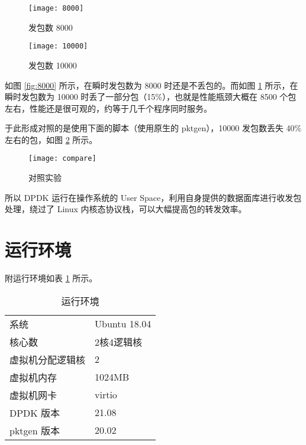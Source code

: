     \begin{figure}[H]
        \centering
        \begin{minipage}{0.48\textwidth}
            \centering
            \texttt{[image: 8000]}
            \caption{发包数 8000}\label{fig:8000}
        \end{minipage}
        \begin{minipage}{0.48\textwidth}
            \centering
            \texttt{[image: 10000]}
            \caption{发包数 10000}\label{fig:10000}
        \end{minipage}
    \end{figure}

    如图 \ref{fig:8000} 所示，在瞬时发包数为 8000 时还是不丢包的。而如图 \ref{fig:10000} 所示，在瞬时发包数为 10000 时丢了一部分包（15\%），也就是性能瓶颈大概在 8500 个包左右，性能还是很可观的，约等于几千个程序同时服务。

    于此形成对照的是使用下面的脚本（使用原生的 pktgen\cite{pktgen}），10000 发包数丢失 40\% 左右的包，如图 \ref{fig:compare} 所示。

    
    \begin{figure}[H]
        \centering
        \texttt{[image: compare]}
        \caption{对照实验}\label{fig:compare}
    \end{figure}

    所以 DPDK 运行在操作系统的 User Space，利用自身提供的数据面库进行收发包处理，绕过了 Linux 内核态协议栈\cite{dpdkinfo}，可以大幅提高包的转发效率。

    \section*{运行环境}

    附运行环境如表 \ref{tab:env} 所示。

    \begin{table}[H]
    \centering
    \caption{运行环境}\label{tab:env}
    \begin{tabular}{ll}
        \toprule
        系统 & Ubuntu 18.04 \\
        核心数 & 2核4逻辑核 \\
        虚拟机分配逻辑核 & 2 \\
        虚拟机内存 & 1024MB \\
        虚拟机网卡 & virtio \\
        DPDK 版本 & 21.08 \\
        pktgen 版本 & 20.02 \\ 
        \bottomrule
    \end{tabular}
    \end{table}

    


